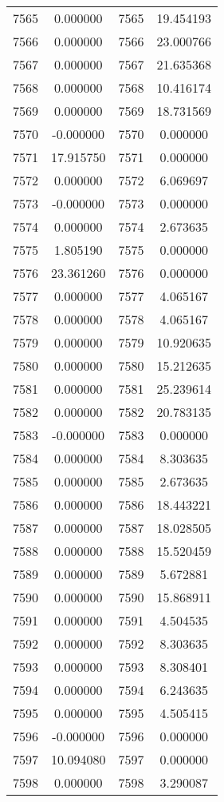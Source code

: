 \documentclass[12pt]{article}
\begin{document}
\begin{longtable}{@{}cccc@{}}
7565 & 0.000000 & 7565 & 19.454193 \\
7566 & 0.000000 & 7566 & 23.000766 \\
7567 & 0.000000 & 7567 & 21.635368 \\
7568 & 0.000000 & 7568 & 10.416174 \\
7569 & 0.000000 & 7569 & 18.731569 \\
7570 & -0.000000 & 7570 & 0.000000 \\
7571 & 17.915750 & 7571 & 0.000000 \\
7572 & 0.000000 & 7572 & 6.069697 \\
7573 & -0.000000 & 7573 & 0.000000 \\
7574 & 0.000000 & 7574 & 2.673635 \\
7575 & 1.805190 & 7575 & 0.000000 \\
7576 & 23.361260 & 7576 & 0.000000 \\
7577 & 0.000000 & 7577 & 4.065167 \\
7578 & 0.000000 & 7578 & 4.065167 \\
7579 & 0.000000 & 7579 & 10.920635 \\
7580 & 0.000000 & 7580 & 15.212635 \\
7581 & 0.000000 & 7581 & 25.239614 \\
7582 & 0.000000 & 7582 & 20.783135 \\
7583 & -0.000000 & 7583 & 0.000000 \\
7584 & 0.000000 & 7584 & 8.303635 \\
7585 & 0.000000 & 7585 & 2.673635 \\
7586 & 0.000000 & 7586 & 18.443221 \\
7587 & 0.000000 & 7587 & 18.028505 \\
7588 & 0.000000 & 7588 & 15.520459 \\
7589 & 0.000000 & 7589 & 5.672881 \\
7590 & 0.000000 & 7590 & 15.868911 \\
7591 & 0.000000 & 7591 & 4.504535 \\
7592 & 0.000000 & 7592 & 8.303635 \\
7593 & 0.000000 & 7593 & 8.308401 \\
7594 & 0.000000 & 7594 & 6.243635 \\
7595 & 0.000000 & 7595 & 4.505415 \\
7596 & -0.000000 & 7596 & 0.000000 \\
7597 & 10.094080 & 7597 & 0.000000 \\
7598 & 0.000000 & 7598 & 3.290087 \\

\end{longtable}
\end{document}
